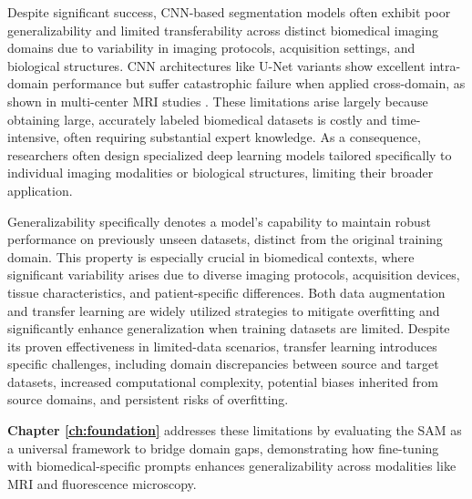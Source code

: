\documentclass[./dissertation.tex]{subfiles}
\begin{document}
Despite significant success, CNN-based segmentation models often exhibit poor generalizability and limited transferability across distinct biomedical imaging domains due to variability in imaging protocols, acquisition settings, and biological structures. CNN architectures like U-Net variants show excellent intra-domain performance but suffer catastrophic failure when applied cross-domain, as shown in multi-center MRI studies \cite{de2023domain}. These limitations arise largely because obtaining large, accurately labeled biomedical datasets is costly and time-intensive, often requiring substantial expert knowledge. As a consequence, researchers often design specialized deep learning models tailored specifically to individual imaging modalities or biological structures, limiting their broader application.

Generalizability specifically denotes a model's capability to maintain robust performance on previously unseen datasets, distinct from the original training domain. This property is especially crucial in biomedical contexts, where significant variability arises due to diverse imaging protocols, acquisition devices, tissue characteristics, and patient-specific differences. Both data augmentation and transfer learning are widely utilized strategies to mitigate overfitting and significantly enhance generalization when training datasets are limited. Despite its proven effectiveness in limited-data scenarios, transfer learning introduces specific challenges, including domain discrepancies between source and target datasets, increased computational complexity, potential biases inherited from source domains, and persistent risks of overfitting.

\textbf{Chapter \ref{ch:foundation}} addresses these limitations by evaluating the SAM \cite{kirillov2023segment} as a universal framework to bridge domain gaps, demonstrating how fine-tuning with biomedical-specific prompts enhances generalizability across modalities like MRI and fluorescence microscopy.
\end{document}
